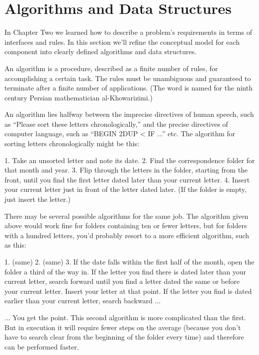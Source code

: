 \section{Algorithms and Data Structures}

In Chapter Two we learned how to describe a problem's requirements in
terms of interfaces and rules. In this section we'll refine the conceptual
model for each component into clearly defined algorithms and data
structures.

An algorithm is a procedure, described as a finite number of rules,
for accomplishing a certain task. The rules must be unambiguous and
guaranteed to terminate after a finite number of applications. (The word
is named for the ninth century Persian mathematician al-Khowarizimi.)

An algorithm lies halfway between the imprecise directives of
human speech, such as ``Please sort these letters chronologically,'' and the
precise directives of computer language, such as ``BEGIN 2DUP < IF ...''
etc. The algorithm for sorting letters chronologically might be this:

1. Take an unsorted letter and note its date.
2. Find the correspondence folder for that month and year.
3. Flip through the letters in the folder, starting from the front, until
   you find the first letter dated later than your current letter.
4. Insert your current letter just in front of the letter dated later.
   (If the folder is empty, just insert the letter.)

There may be several possible algorithms for the same job. The algorithm
given above would work fine for folders containing ten or fewer letters,
but for folders with a hundred letters, you'd probably resort to a more
efficient algorithm, such as this:

1. (same)
2. (same)
3. If the date falls within the first half of the month, open the folder a
   third of the way in. If the letter you find there is dated later than your
   current letter, search forward until you find a letter dated the same or
   before your current letter. Insert your letter at that point. If the letter
   you find is dated earlier than your current letter, search backward ...

... You get the point. This second algorithm is more complicated than
the first. But in execution it will require fewer steps on the average
(because you don't have to search clear from the beginning of the folder
every time) and therefore can be performed faster.

